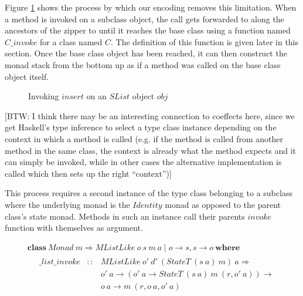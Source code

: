 \documentclass[runningheads,a4paper]{llncs}
\newcommand{\todo}[1]{[{\color{blue}#1}]}
\begin{document}
Figure \ref{fig:subinvoke} shows the process by which our encoding removes this limitation. When a method is invoked on a subclass object, the call gets forwarded to along the ancestors of the zipper to until it reaches the base class using a function named $C\_\mathit{invoke}$ for a class named $C$. The definition of this function is given later in this section. Once the base class object has been reached, it can then construct the monad stack from the bottom up as if a method was called on the base class object itself.

\begin{figure}
\begin{center}
\end{center}
\caption{Invoking $\mathit{insert}$ on an $\mathit{SList}$ object $\mathit{obj}$} \label{fig:subinvoke}
\end{figure}

\todo{BTW: I think there may be an interesting connection to coeffects here, since we get Haskell's type inference to select a type class instance depending on the context in which a method is called (e.g. if the method is called from another method in the same class, the context is already what the method expects and it can simply be invoked, while in other cases the alternative implementation is called which then sets up the right ``context'')}

This process requires a second instance of the type class belonging to a subclass where the underlying monad is the $\mathit{Identity}$ monad as opposed to the parent class's state monad. Methods in such an instance call their parents $\mathit{invoke}$ function with themselves as argument.

\begin{displaymath}
\begin{array}{l}
\mathbf{class}~\mathit{Monad}~m \Rightarrow \mathit{MListLike}~o~s~m~a \mid o \to s, s \to o~\mathbf{where} \\
\quad \begin{array}{lcl}
\_\mathit{list}\_\mathit{invoke} & :: & \mathit{MListLike}~o'~d'~(\mathit{StateT}~(s~a)~m)~a \Rightarrow\\
                                 &    & o'~a \to (o'~a \to \mathit{StateT}~(s~a)~m~(r,o'~a)) \to\\
                                 &    & o~a \to m~(r,o~a,o'~a)
\end{array} 
\end{array}
\end{displaymath}
\end{document}
